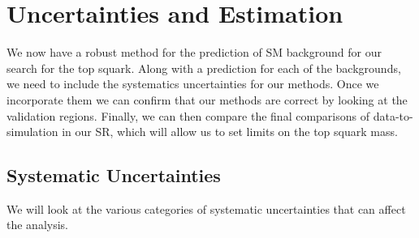 \chapter{Uncertainties and Estimation}
\label{ch:UncertandEst}

We now have a robust method for the prediction of SM background for our search for the top squark. Along with a prediction for each of the backgrounds, we need to include the systematics uncertainties for our methods. Once we incorporate them we can confirm that our methods are correct by looking at the validation regions. Finally, we can then compare the final comparisons of data-to-simulation in our SR, which will allow us to set limits on the top squark mass. 

\section{Systematic Uncertainties}\label{sec:Uncert}
We will look at the various categories of systematic uncertainties that can affect the analysis. 
